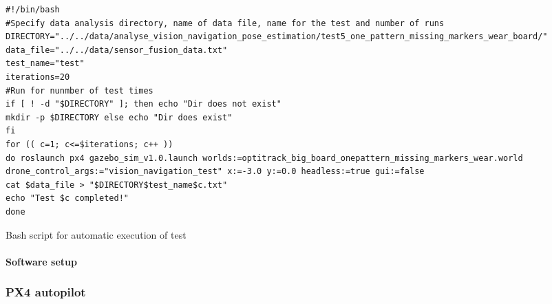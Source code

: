\documentclass[../Head/report.tex]{subfiles}
\begin{document}
\begin{listing}[H] 
\begin{tcolorbox}[
    enhanced,
    attach boxed title to top left={xshift=6mm,yshift=-3mm},
    colback=lightgreen!20,
    colframe=lightgreen,
    fonttitle=\bfseries\color{black},
]
\begin{verbatim}
#!/bin/bash
#Specify data analysis directory, name of data file, name for the test and number of runs
DIRECTORY="../../data/analyse_vision_navigation_pose_estimation/test5_one_pattern_missing_markers_wear_board/"
data_file="../../data/sensor_fusion_data.txt"
test_name="test"
iterations=20
#Run for nunmber of test times 
if [ ! -d "$DIRECTORY" ]; then echo "Dir does not exist" 
mkdir -p $DIRECTORY else echo "Dir does exist"
fi
for (( c=1; c<=$iterations; c++ ))
do roslaunch px4 gazebo_sim_v1.0.launch worlds:=optitrack_big_board_onepattern_missing_markers_wear.world drone_control_args:="vision_navigation_test" x:=-3.0 y:=0.0 headless:=true gui:=false 
cat $data_file > "$DIRECTORY$test_name$c.txt" 
echo "Test $c completed!"
done

\end{verbatim}
\end{tcolorbox}
\caption{Bash script for automatic execution of test}
\label{lst:bash_script_for_automatic_execution_of_test}    
\end{listing}   

\paragraph{Software setup} 



\subsubsection{PX4 autopilot}
\label{sec:px4_flight_stack}
\end{document}
